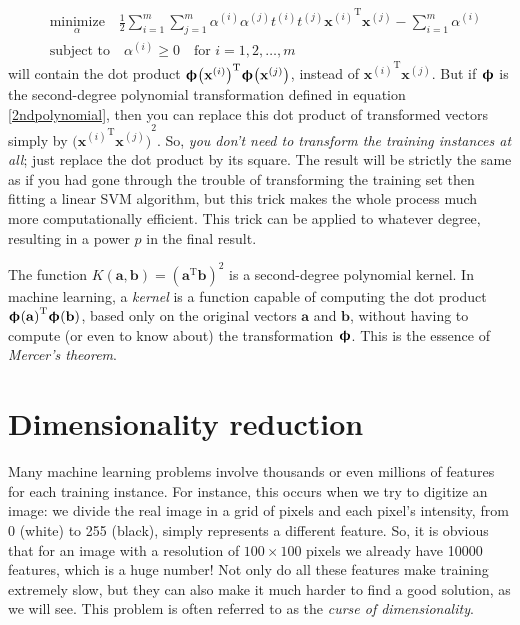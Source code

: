 \begin{align*}
&\underset{\alpha}{\text{minimize}}\quad\frac{1}{2}\sum_{i=1}^m\sum_{j=1}^m\alpha^{(i)}\alpha^{(j)}t^{(i)}t^{(j)}{\mathbf{x}^{(i)}}^{\mathrm{T}}\mathbf{x}^{(j)}-\sum_{i=1}^m\alpha^{(i)}\\
&\text{subject to}\quad\alpha^{(i)}\geq0\quad\text{for $i=1,2,\ldots,m$}
\end{align*}
will contain the dot product ${\boldsymbol{\upphi}\bigl(\mathbf{x}^{(i)}\bigr)}^{\mathrm{T}}\boldsymbol{\upphi}\bigl(\mathbf{x}^{(j)}\bigr)$, instead of ${\mathbf{x}^{(i)}}^{\mathrm{T}}\mathbf{x}^{(j)}$. But if $\boldsymbol{\upphi}$ is the second-degree polynomial transformation defined in equation \eqref{2ndpolynomial}, then you can replace this dot product of transformed vectors simply by ${\bigl({\mathbf{x}^{(i)}}^{\mathrm{T}}\mathbf{x}^{(j)}\bigr)}^2$. So, \emph{you don't need to transform the training instances at all}; just replace the dot product by its square. The result will be strictly the same as if you had gone through the trouble of transforming the training set then fitting a linear SVM algorithm, but this trick makes the whole process much more computationally efficient. This trick can be applied to whatever degree, resulting in a power $p$ in the final result.

The function $K(\mathbf{a},\mathbf{b})={(\mathbf{a}^{\mathrm{T}}\mathbf{b})}^2$ is a second-degree polynomial kernel. In machine learning, a \emph{kernel} is a function capable of computing the dot product ${\boldsymbol{\upphi}(\mathbf{a})}^{\mathrm{T}}\boldsymbol{\upphi}(\mathbf{b})$, based only on the original vectors $\mathbf{a}$ and $\mathbf{b}$, without having to compute (or even to know about) the transformation $\boldsymbol{\upphi}$. This is the essence of \emph{Mercer's theorem}.
\section{Dimensionality reduction}\label{sec:Dimensionality_reduction}
Many machine learning problems involve thousands or even millions of features for each training instance. For instance, this occurs when we try to digitize an image: we divide the real image in a grid of pixels and each pixel's intensity, from 0 (white) to 255 (black), simply represents a different feature. So, it is obvious that for an image with a resolution of $100\times100$ pixels we already have \num{10000} features, which is a huge number! Not only do all these features make training extremely slow, but they can also make it much harder to find a good solution, as we will see. This problem is often referred to as the \emph{curse of dimensionality}.

